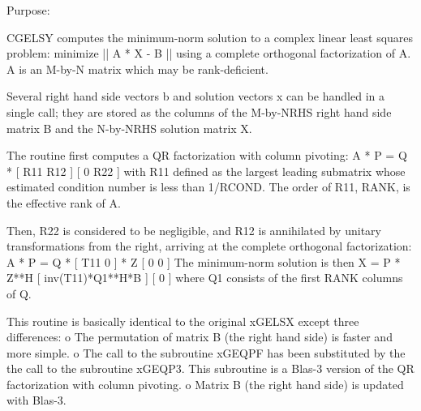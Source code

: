  \begin{DoxyParagraph}{Purpose\+: }
\begin{DoxyVerb} CGELSY computes the minimum-norm solution to a complex linear least
 squares problem:
     minimize || A * X - B ||
 using a complete orthogonal factorization of A.  A is an M-by-N
 matrix which may be rank-deficient.

 Several right hand side vectors b and solution vectors x can be
 handled in a single call; they are stored as the columns of the
 M-by-NRHS right hand side matrix B and the N-by-NRHS solution
 matrix X.

 The routine first computes a QR factorization with column pivoting:
     A * P = Q * [ R11 R12 ]
                 [  0  R22 ]
 with R11 defined as the largest leading submatrix whose estimated
 condition number is less than 1/RCOND.  The order of R11, RANK,
 is the effective rank of A.

 Then, R22 is considered to be negligible, and R12 is annihilated
 by unitary transformations from the right, arriving at the
 complete orthogonal factorization:
    A * P = Q * [ T11 0 ] * Z
                [  0  0 ]
 The minimum-norm solution is then
    X = P * Z**H [ inv(T11)*Q1**H*B ]
                 [        0         ]
 where Q1 consists of the first RANK columns of Q.

 This routine is basically identical to the original xGELSX except
 three differences:
   o The permutation of matrix B (the right hand side) is faster and
     more simple.
   o The call to the subroutine xGEQPF has been substituted by the
     the call to the subroutine xGEQP3. This subroutine is a Blas-3
     version of the QR factorization with column pivoting.
   o Matrix B (the right hand side) is updated with Blas-3.\end{DoxyVerb}
 
\end{DoxyParagraph}

